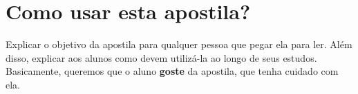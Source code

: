 \chapter*{Como usar esta apostila?}

Explicar o objetivo da apostila para qualquer pessoa que pegar ela para ler. Além disso, explicar aos alunos como devem utilizá-la ao longo de seus estudos. Basicamente, queremos que o aluno \textbf{goste} da apostila, que tenha cuidado com ela.